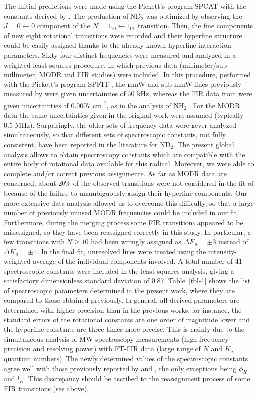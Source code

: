 \documentclass[twocolumn]{aastex61}
\begin{document}
The initial predictions were made using the Pickett's program SPCAT \citep{Pic91} with the constants derived by \citet{Kan91}.
The production of ND$_{2}$ was optimized by observing the $J=0\gets0$ component of the $N=1_{10}\gets1_{01}$ transition.
Then, the fine components of new eight rotational transitions were recorded and their hyperfine structure could be easily assigned
thanks to the already known hyperfine-interaction parameters.
Sixty-four distinct frequencies were measured and analyzed in a weighted least-squares procedure, in which previous data 
(millimeter/sub-millimeter, MODR and FIR studies) were included.
In this procedure, performed with the Pickett's program SPFIT \citep{Pic91}, the mmW and sub-mmW lines previously measured 
by \citet{Kan91} were given uncertainties of 50 kHz, whereas the FIR data from \citet{Mor97} were given uncertainties of 
0.0007 cm\textsuperscript{-1}, as in the analysis of NH$_{2}$ \citep{Mul99}.
For the MODR data \citep{Coo83} the same uncertainties given in the original work were assumed (typically 0.5 MHz).
Surprisingly, the older sets of frequency data were never analyzed simultaneously, so that different sets of spectroscopic constants, 
not fully consistent, have been reported in the literature for ND$_{2}$. The present global analysis allows to obtain spectroscopy 
constants which are compatible with the entire body of rotational data available for this radical. Moreover, we were able to 
complete and/or correct previous assignments. As far as MODR data are concerned, about 20\% of the observed transitions were not considered
in the fit of \citet{Coo83} because  of the failure to unambiguously assign their hyperfine components. Our more extensive 
data analysis allowed us to overcome this difficulty, so that a large number of previously unused MODR frequencies could be 
included in our fit. Furthermore, during the merging process some FIR transitions appeared to be misassigned, so they have been 
reassigned correctly in this study.
In particular, a few transitions with $N \ge 10$ had been wrongly assigned as $\Delta K_{a}=\pm3$ instead of $\Delta K_{a}=\pm1$.
In the final fit, unresolved lines were treated using the intensity-weighted average of the individual components involved.
A total number of 41 spectroscopic constants were included in the least squares analysis, giving a satisfactory dimensionless standard
deviation of 0.87.
Table~\ref{tbl-1} shows the list of spectroscopic parameters determined in the present work, where they are compared to those 
obtained previously. In general, all derived parameters are determined with higher precision than in the previous 
works: for instance, the standard errors of the rotational constants are one order of magnitude lower and the hyperfine constants 
are three times more precise. This is mainly due to the simultaneous analysis of MW spectroscopy measurements
(high frequency precision and resolving power) with FT-FIR data (large range of $N$ and $K_a$ quantum numbers).
The newly determined values of the spectroscopic constants agree well with those previously reported by \citet{Kan91} and \citet{Mor97},
the only exceptions being $\phi_K$ and $l_K$. This discrepancy should be ascribed to the reassignment process of some FIR transitions (see above).
\end{document}
